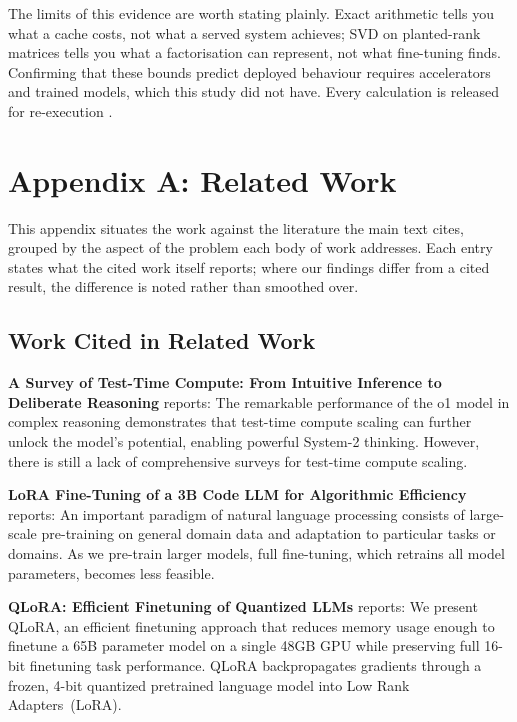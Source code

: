 \documentclass[10pt,journal,compsoc,twocolumn]{IEEEtran}
\begin{document}
The limits of this evidence are worth stating plainly. Exact arithmetic tells you what a cache costs, not what a served system achieves; SVD on planted-rank matrices tells you what a factorisation can represent, not what fine-tuning finds. Confirming that these bounds predict deployed behaviour requires accelerators and trained models, which this study did not have. Every calculation is released for re-execution \cite{arxiv_2406_00584,crossref_10_1201_9788743808145_14}.





\section{Appendix A: Related Work}


This appendix situates the work against the literature the main text cites, grouped by the aspect of the problem each body of work addresses. Each entry states what the cited work itself reports; where our findings differ from a cited result, the difference is noted rather than smoothed over.


\subsection{Work Cited in Related Work}


\textbf{A Survey of Test-Time Compute: From Intuitive Inference to Deliberate Reasoning} \cite{arxiv_2501_02497} reports: The remarkable performance of the o1 model in complex reasoning demonstrates that test-time compute scaling can further unlock the model's potential, enabling powerful System-2 thinking. However, there is still a lack of comprehensive surveys for test-time compute scaling.

\textbf{LoRA Fine-Tuning of a 3B Code LLM for Algorithmic Efficiency} \cite{crossref_10_48550_arxiv_2106_09685} reports: An important paradigm of natural language processing consists of large-scale pre-training on general domain data and adaptation to particular tasks or domains. As we pre-train larger models, full fine-tuning, which retrains all model parameters, becomes less feasible.

\textbf{QLoRA: Efficient Finetuning of Quantized LLMs} \cite{crossref_10_48550_arxiv_2305_14314} reports: We present QLoRA, an efficient finetuning approach that reduces memory usage enough to finetune a 65B parameter model on a single 48GB GPU while preserving full 16-bit finetuning task performance. QLoRA backpropagates gradients through a frozen, 4-bit quantized pretrained language model into Low Rank Adapters~(LoRA).
\end{document}
